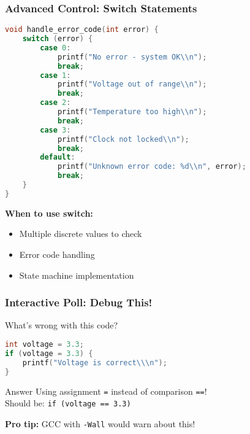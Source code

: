 \documentclass{beamer}
\begin{document}
\begin{frame}[fragile]
\frametitle{Advanced Control: Switch Statements}
\begin{lstlisting}[language=C]
void handle_error_code(int error) {
    switch (error) {
        case 0:
            printf("No error - system OK\\n");
            break;
        case 1:
            printf("Voltage out of range\\n");
            break;
        case 2:
            printf("Temperature too high\\n");
            break;
        case 3:
            printf("Clock not locked\\n");
            break;
        default:
            printf("Unknown error code: %d\\n", error);
            break;
    }
}
\end{lstlisting}

\textbf{When to use switch:}
\begin{itemize}
    \item Multiple discrete values to check
    \item Error code handling
    \item State machine implementation
\end{itemize}
\end{frame}

\begin{frame}
\frametitle{Interactive Poll: Debug This!}
\begin{center}
\Large What's wrong with this code?
\end{center}

\begin{lstlisting}[language=C]
int voltage = 3.3;
if (voltage = 3.3) {
    printf("Voltage is correct\\\n");
}
\end{lstlisting}

\pause

\begin{alertblock}{Answer}
Using assignment \texttt{=} instead of comparison \texttt{==}!\\
Should be: \texttt{if (voltage == 3.3)}
\end{alertblock}

\vspace{0.5cm}
\textbf{Pro tip:} GCC with \texttt{-Wall} would warn about this!
\end{frame}
\end{document}
